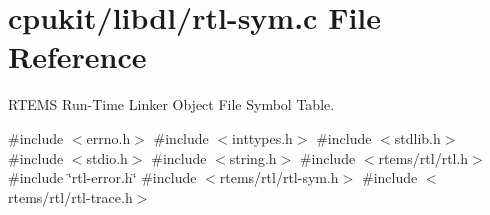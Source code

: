 \hypertarget{rtl-sym_8c}{}\section{cpukit/libdl/rtl-\/sym.c File Reference}
\label{rtl-sym_8c}


R\+T\+E\+MS Run-\/\+Time Linker Object File Symbol Table.  


{\ttfamily \#include $<$errno.\+h$>$}\newline
{\ttfamily \#include $<$inttypes.\+h$>$}\newline
{\ttfamily \#include $<$stdlib.\+h$>$}\newline
{\ttfamily \#include $<$stdio.\+h$>$}\newline
{\ttfamily \#include $<$string.\+h$>$}\newline
{\ttfamily \#include $<$rtems/rtl/rtl.\+h$>$}\newline
{\ttfamily \#include \char`\"{}rtl-\/error.\+h\char`\"{}}\newline
{\ttfamily \#include $<$rtems/rtl/rtl-\/sym.\+h$>$}\newline
{\ttfamily \#include $<$rtems/rtl/rtl-\/trace.\+h$>$}\newline
